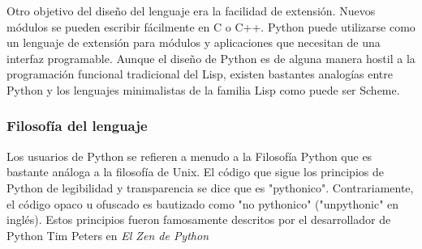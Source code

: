 \documentclass[a4paper]{report}
\begin{document}
Otro objetivo del diseño del lenguaje era la facilidad de extensión. 
Nuevos módulos se pueden escribir fácilmente en C o C++. 
Python puede utilizarse como un lenguaje de extensión para módulos y 
aplicaciones que necesitan de una interfaz programable. Aunque el diseño de Python es 
de alguna manera hostil a la programación funcional tradicional del Lisp, existen bastantes analogías 
entre Python y los lenguajes minimalistas de la familia Lisp como puede ser Scheme.

\subsubsection*{Filosofía del lenguaje}

Los usuarios de Python se refieren a menudo a la Filosofía Python que es
bastante análoga a la filosofía de Unix. El código que sigue los principios de
Python de legibilidad y transparencia se dice que es "pythonico".
Contrariamente, el código opaco u ofuscado es bautizado como "no pythonico"
("unpythonic" en inglés). Estos principios fueron famosamente descritos por el
desarrollador de Python Tim Peters en \emph{El Zen de Python}
\end{document}
